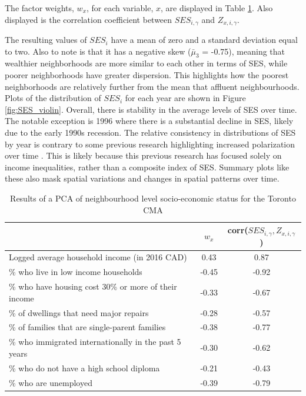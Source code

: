 The factor weights, $w_x$, for each variable, $x$, are displayed in Table \ref{table:pca}. Also displayed is the correlation coefficient between $SES_{i,\gamma}$ and $Z_{x,i,\gamma}$. 




The resulting values of $SES_i$ have a mean of zero and a standard deviation equal to two. Also to note is that it has a negative skew ($\bar{\mu}_3$ = -0.75), meaning that wealthier neighborhoods are more similar to each other in terms of SES, while poorer neighborhoods have greater dispersion. This highlights how the poorest neighborhoods are relatively further from the mean that affluent neighbourhoods. Plots of the distribution of $SES_i$ for each year are shown in Figure \ref{fig:SES_violin}. Overall, there is stability in the average levels of SES over time. The notable exception is 1996 where there is a substantial decline in SES, likely due to the early 1990s recession. The relative consistency in distributions of SES by year is contrary to some previous research highlighting increased polarization over time \cite{hulchanski_three_2010}. This is likely because this previous research has focused solely on income inequalities, rather than a composite index of SES. Summary plots like these also mask spatial variations and changes in spatial patterns over time.


\begin{table}[h]
	\small
	\centering
	\caption{{Results of a PCA of neighbourhood level socio-economic status for the Toronto CMA}}
	\label{table:pca}
	\begin{tabular}{lcc}
		
		\hline
		& $w_x$     & corr($SES_{i,\gamma}, Z_{x,i,\gamma}$)   \\
		\hline
		Logged average household income (in 2016 CAD)  & 0.43 & 0.87 \\
		\% who live in low income households     & -0.45  & -0.92  \\
		
		\% who have housing cost 30\% or more of their income & -0.33  & -0.67  \\
		\% of dwellings that need major repairs    & -0.28  & -0.57  \\
		\% of families that are single-parent families     & -0.38  & -0.77  \\
		\% who immigrated internationally in the past 5 years    & -0.30  & -0.62  \\
		\% who do not have a high school diploma  & -0.21  & -0.43  \\
		\% who are unemployed   & -0.39  & -0.79 \\
		\hline
	\end{tabular}
\end{table}



